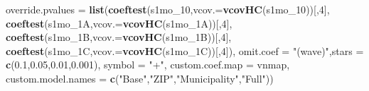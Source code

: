 \documentclass[
]{article}
\newenvironment{Shaded}{\begin{snugshade}}{\end{snugshade}}
\newcommand{\DataTypeTok}[1]{\textcolor[rgb]{0.13,0.29,0.53}{#1}}
\newcommand{\DecValTok}[1]{\textcolor[rgb]{0.00,0.00,0.81}{#1}}
\newcommand{\FloatTok}[1]{\textcolor[rgb]{0.00,0.00,0.81}{#1}}
\newcommand{\KeywordTok}[1]{\textcolor[rgb]{0.13,0.29,0.53}{\textbf{#1}}}
\newcommand{\NormalTok}[1]{#1}
\newcommand{\StringTok}[1]{\textcolor[rgb]{0.31,0.60,0.02}{#1}}
\begin{document}
\begin{Shaded}
\begin{Highlighting}[]
          \DataTypeTok{override.pvalues =} \KeywordTok{list}\NormalTok{(}\KeywordTok{coeftest}\NormalTok{(s1mo_}\DecValTok{10}\NormalTok{,}\DataTypeTok{vcov.=}\KeywordTok{vcovHC}\NormalTok{(s1mo_}\DecValTok{10}\NormalTok{))[,}\DecValTok{4}\NormalTok{],}
                                  \KeywordTok{coeftest}\NormalTok{(s1mo_1A,}\DataTypeTok{vcov.=}\KeywordTok{vcovHC}\NormalTok{(s1mo_1A))[,}\DecValTok{4}\NormalTok{],}
                                  \KeywordTok{coeftest}\NormalTok{(s1mo_1B,}\DataTypeTok{vcov.=}\KeywordTok{vcovHC}\NormalTok{(s1mo_1B))[,}\DecValTok{4}\NormalTok{],}
                                  \KeywordTok{coeftest}\NormalTok{(s1mo_1C,}\DataTypeTok{vcov.=}\KeywordTok{vcovHC}\NormalTok{(s1mo_1C))[,}\DecValTok{4}\NormalTok{]),}
          \DataTypeTok{omit.coef =} \StringTok{"(wave)"}\NormalTok{,}\DataTypeTok{stars =} \KeywordTok{c}\NormalTok{(}\FloatTok{0.1}\NormalTok{,}\FloatTok{0.05}\NormalTok{,}\FloatTok{0.01}\NormalTok{,}\FloatTok{0.001}\NormalTok{), }\DataTypeTok{symbol =} \StringTok{"+"}\NormalTok{,}
          \DataTypeTok{custom.coef.map =}\NormalTok{ vnmap, }
          \DataTypeTok{custom.model.names =} \KeywordTok{c}\NormalTok{(}\StringTok{"Base"}\NormalTok{,}\StringTok{"ZIP"}\NormalTok{,}\StringTok{"Municipality"}\NormalTok{,}\StringTok{"Full"}\NormalTok{))}
\end{Highlighting}
\end{Shaded}
\end{document}
